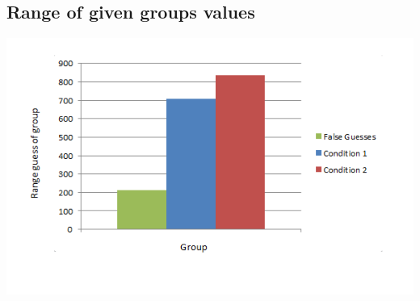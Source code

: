 \documentclass{report}
\begin{document}
\subsection{Range of given groups values}
\includegraphics[width=\textwidth]{table3}
\end{document}
